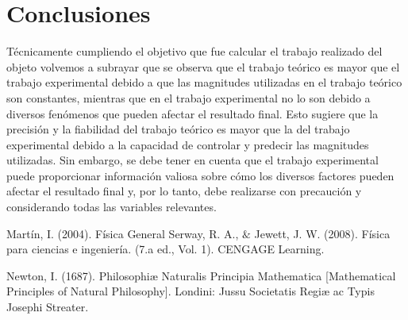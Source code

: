 \documentclass{article}
\begin{document}
\section{Conclusiones}\label{Conclusiones}				%
Técnicamente cumpliendo el objetivo que fue calcular el trabajo realizado del objeto volvemos a subrayar que se observa que el trabajo teórico es mayor que el trabajo experimental debido a que las magnitudes utilizadas en el trabajo teórico son constantes, mientras que en el trabajo experimental no lo son debido a diversos fenómenos que pueden afectar el resultado final. Esto sugiere que la precisión y la fiabilidad del trabajo teórico es mayor que la del trabajo experimental debido a la capacidad de controlar y predecir las magnitudes utilizadas. Sin embargo, se debe tener en cuenta que el trabajo experimental puede proporcionar información valiosa sobre cómo los diversos factores pueden afectar el resultado final y, por lo tanto, debe realizarse con precaución y considerando todas las variables relevantes.

\begin{thebibliography}{9}						%
		Martín, I. (2004). Física General
		Serway, R. A., $\&$ Jewett, J. W. (2008). Física para ciencias e ingeniería. (7.a
ed., Vol. 1). CENGAGE Learning.

	Newton, I. (1687). Philosophiæ Naturalis Principia Mathematica [Mathematical Principles of Natural Philosophy]. Londini: Jussu Societatis Regiæ ac Typis Josephi Streater.
\end{thebibliography}
\end{document}
